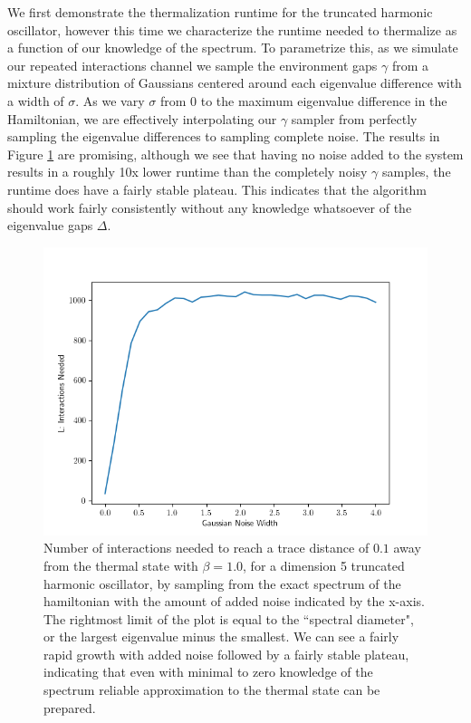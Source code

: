 \documentclass{article}
\begin{document}
We first demonstrate the thermalization runtime for the truncated harmonic oscillator, however this time we characterize the runtime needed to thermalize as a function of our knowledge of the spectrum. To parametrize this, as we simulate our repeated interactions channel we sample the environment gaps $\gamma$ from a mixture distribution of Gaussians centered around each eigenvalue difference with a width of $\sigma$. As we vary $\sigma$ from 0 to the maximum eigenvalue difference in the Hamiltonian, we are effectively interpolating our $\gamma$ sampler from perfectly sampling the eigenvalue differences to sampling complete noise. The results in Figure \ref{fig:sho_with_noise} are promising, although we see that having no noise added to the system results in a roughly 10x lower runtime than the completely noisy $\gamma$ samples, the runtime does have a fairly stable plateau. This indicates that the algorithm should work fairly consistently without any knowledge whatsoever of the eigenvalue gaps $\Delta$.

\begin{figure}
    \centering
    \includegraphics[width=0.5\linewidth]{numerics/data/sho_with_noise_1.png}
    \caption{Number of interactions needed to reach a trace distance of $0.1$ away from the thermal state with $\beta = 1.0$, for a dimension 5 truncated harmonic oscillator, by sampling from the exact spectrum of the hamiltonian with the amount of added noise indicated by the x-axis. The rightmost limit of the plot is equal to the ``spectral diameter", or the largest eigenvalue minus the smallest. We can see a fairly rapid growth with added noise followed by a fairly stable plateau, indicating that even with minimal to zero knowledge of the spectrum reliable approximation to the thermal state can be prepared. }
    \label{fig:sho_with_noise}
\end{figure}
\end{document}
